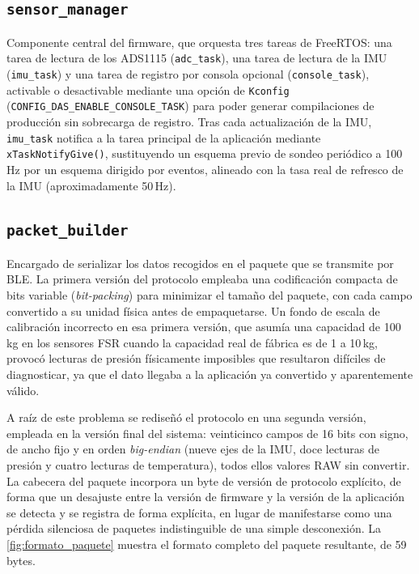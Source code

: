\begin{IAtext}
\subsection{\texttt{sensor\_manager}}
Componente central del firmware, que orquesta tres tareas de FreeRTOS: una tarea de lectura de los ADS1115 (\texttt{adc\_task}), una tarea de lectura de la IMU (\texttt{imu\_task}) y una tarea de registro por consola opcional (\texttt{console\_task}), activable o desactivable mediante una opción de \texttt{Kconfig} (\texttt{CONFIG\_DAS\_ENABLE\_CONSOLE\_TASK}) para poder generar compilaciones de producción sin sobrecarga de registro. Tras cada actualización de la IMU, \texttt{imu\_task} notifica a la tarea principal de la aplicación mediante \texttt{xTaskNotifyGive()}, sustituyendo un esquema previo de sondeo periódico a 100\,Hz por un esquema dirigido por eventos, alineado con la tasa real de refresco de la IMU (aproximadamente 50\,Hz).

\subsection{\texttt{packet\_builder}}\label{sec:proto_raw}
Encargado de serializar los datos recogidos en el paquete que se transmite por BLE. La primera versión del protocolo empleaba una codificación compacta de bits variable (\textit{bit-packing}) para minimizar el tamaño del paquete, con cada campo convertido a su unidad física antes de empaquetarse. Un fondo de escala de calibración incorrecto en esa primera versión, que asumía una capacidad de 100\,kg en los sensores FSR cuando la capacidad real de fábrica es de 1 a 10\,kg, provocó lecturas de presión físicamente imposibles que resultaron difíciles de diagnosticar, ya que el dato llegaba a la aplicación ya convertido y aparentemente válido.

A raíz de este problema se rediseñó el protocolo en una segunda versión, empleada en la versión final del sistema: veinticinco campos de 16 bits con signo, de ancho fijo y en orden \textit{big-endian} (nueve ejes de la IMU, doce lecturas de presión y cuatro lecturas de temperatura), todos ellos valores RAW sin convertir. La cabecera del paquete incorpora un byte de versión de protocolo explícito, de forma que un desajuste entre la versión de firmware y la versión de la aplicación se detecta y se registra de forma explícita, en lugar de manifestarse como una pérdida silenciosa de paquetes indistinguible de una simple desconexión. La \cref{fig:formato_paquete} muestra el formato completo del paquete resultante, de 59 bytes.


\end{IAtext}

